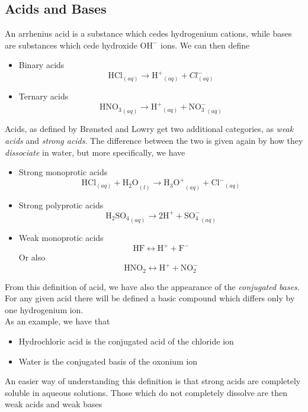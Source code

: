 \documentclass[../qm.tex]{subfiles}
\begin{document}
\subsection{Acids and Bases}
\begin{dfn}
	An arrhenius acid is a substance which cedes hydrogenium cations, while bases are substances which cede hydroxide $\mathrm{OH^-}$ ions. We can then define 
	\begin{itemize}
	\item Binary acids
		\begin{equation*}
			\mathrm{HCl}_{(aq)}\to\mathrm{H^+}_{(aq)}+Cl^-_{(aq)}
		\end{equation*}
	\item Ternary acids
		\begin{equation*}
			\mathrm{HNO_3}_{(aq)}\to\mathrm{H^+}_{(aq)}+\mathrm{NO_3^-}_{(aq)}
		\end{equation*}
	\end{itemize}
\end{dfn}
\begin{dfn}
	Acids, as defined by Brønsted and Lowry get two additional categories, as \textit{weak acids} and \textit{strong acids}. The difference between the two is given again by how they \textit{dissociate} in water, but more specifically, we have
	\begin{itemize}
	\item Strong monoprotic acids
		\begin{equation*}
			\mathrm{HCl}_{(aq)}+\mathrm{H_2O}_{(l)}\to\mathrm{H_3O^+}_{(aq)}+\mathrm{Cl^-}_{(aq)}
		\end{equation*}
	\item Strong polyprotic acids
		\begin{equation*}
			\mathrm{H_2SO_4}_{(aq)}\to2\mathrm{H^+}+\mathrm{SO_4^-}_{(aq)}
		\end{equation*}
	\item Weak monoprotic acids
		\begin{equation*}
			\mathrm{HF}\longleftrightarrow\mathrm{H^+}+\mathrm{F^-}
		\end{equation*}
		Or also
		\begin{equation*}
			\mathrm{HNO_2}\longleftrightarrow\mathrm{H^+}+\mathrm{NO_2^-}
		\end{equation*}
	\end{itemize}
	From this definition of acid, we have also the appearance of the \textit{conjugated bases}. For any given acid there will be defined a basic compound which differs only by one hydrogenium ion.\\
	As an example, we have that 
	\begin{itemize}
	\item Hydrochloric acid is the conjugated acid of the chloride ion
	\item Water is the conjugated basis of the oxonium ion
	\end{itemize}
	An easier way of understanding this definition is that strong acids are completely soluble in aqueous solutions. Those which do not completely dissolve are then weak acids and weak bases
\end{dfn}
\end{document}
